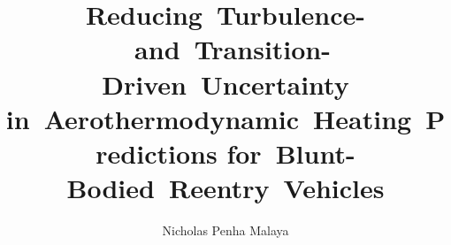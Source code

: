 \documentclass[final,letterpaper,12pt]{report}    %
\author{Nicholas Penha Malaya}
\title{%
    \mbox{Reducing Turbulence- and Transition-Driven Uncertainty}
    \mbox{in Aerothermodynamic Heating Predictions}
    \mbox{for Blunt-Bodied Reentry Vehicles}
}
\theoremstyle{definition}
\theoremstyle{remark}
\begin{document}
\draftonly{\listoftodos\clearpage}  %

\copyrightpage{}                    %

%
%
%
\commcertpage{}         %

\titlepage{}            %


\begin{dedication}

\end{dedication}

\begin{acknowledgments}

\end{acknowledgments}

%
\utabstract{}

\indent

\cleardoublepage
{}  %
\makeatletter
\renewcommand{\@pnumwidth}{1.70em}
\makeatother
\tableofcontents
\listoftables
\listoffigures
{}      %
\oneandonehalfspacequote{}

\end{document}
